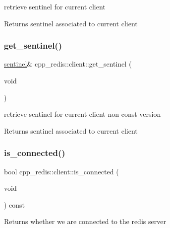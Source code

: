 retrieve sentinel for current client

\begin{DoxyReturn}{Returns}
sentinel associated to current client 
\end{DoxyReturn}
\mbox{\label{classcpp__redis_1_1client_a9457cea98f061ce6071f897ba8605813}} 
\subsubsection{\texorpdfstring{get\+\_\+sentinel()}{get\_sentinel()}\hspace{0.1cm}{\footnotesize\ttfamily [2/2]}}
{\footnotesize\ttfamily \hyperlink{classcpp__redis_1_1sentinel}{sentinel}\& cpp\+\_\+redis\+::client\+::get\+\_\+sentinel (\begin{DoxyParamCaption}\item[{void}]{ }\end{DoxyParamCaption})}

retrieve sentinel for current client non-\/const version

\begin{DoxyReturn}{Returns}
sentinel associated to current client 
\end{DoxyReturn}
\mbox{\label{classcpp__redis_1_1client_ad3608dec2c2bfabf2c621ce14f4db37a}} 
\subsubsection{\texorpdfstring{is\+\_\+connected()}{is\_connected()}}
{\footnotesize\ttfamily bool cpp\+\_\+redis\+::client\+::is\+\_\+connected (\begin{DoxyParamCaption}\item[{void}]{ }\end{DoxyParamCaption}) const}

\begin{DoxyReturn}{Returns}
whether we are connected to the redis server 
\end{DoxyReturn}
\mbox{\label{classcpp__redis_1_1client_af03ca1aec6416ab35e6aea93c74d89d1}} 

